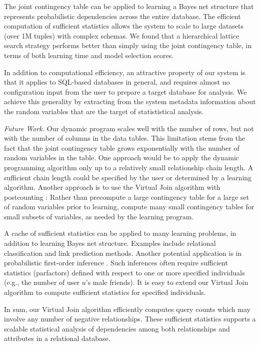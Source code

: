 \documentclass{vldb}
\begin{document}
The joint contingency table can be applied to learning a Bayes net structure that represents probabilistic dependencies across the entire database. 
The efficient computation of sufficient statistics allows the system to scale to large datasets (over 1M tuples) with complex schemas. 
We found that a hierarchical lattice search strategy \cite{Schulte2012} performs better than simply using the joint contingency table, in terms of both learning time and model selection scores. 

In addition to computational efficiency, an attractive property of our system is that it applies to SQL-based databases in general, and requires almost no configuration input from the  user to prepare a target database for analysis.
We achieve this generality by extracting from the system metadata information about the random variables that are the target of statististical analysis.  


\emph{Future Work.} 
Our dynamic program scales well with the number of rows, but not with the number of columns in the data tables. 
This limitation stems from the fact that the joint contingency table grows exponentially with the number of random variables in the table.
One approach would be to apply the dynamic programming algorithm only up to a relatively small relationship chain length.
A sufficient chain length could be specified by the user or determined by a learning algorithm. 
Another approach is to use the Virtual Join algorithm with postcounting \cite{lv2012}: Rather than precompute a large contingency table for a large set of random variables prior to learning, compute many small contingency tables for  small subsets of variables, as needed by the learning program. 
%

A cache of sufficient statistics can be applied to many learning problems, in addition to learning Bayes net structure. Examples include relational classification and link prediction methods. Another potential application is in probabilistic first-order inference \cite{Poole2003}. Such inferences often require sufficient statistics (parfactors) defined with respect to one or more specified individuals (e.g., the number of user $u$'s male friends). It is easy to extend our Virtual Join algorithm to compute sufficient statistics for specified individuals. 

In sum, our Virtual Join algorithm efficiently computes query counts which may involve any number of negative relationships. %
These sufficient statistics supports a scalable statistical analysis of  dependencies among both relationships and attributes in a relational database.
\end{document}
